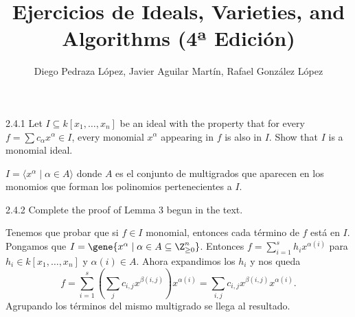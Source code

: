 \documentclass[twoside]{article}
\begin{document}
\title{Ejercicios de Ideals, Varieties, and Algorithms (4ª Edición)}
\author{Diego Pedraza López, Javier Aguilar Martín, Rafael González López}
\maketitle

\begin{ejercicio}{2.4.1}
Let $I ⊆ k[x_1,\dots , x_n]$ be an ideal with the property that for every $f =\sum
c_{α} x^{α} ∈ I$, every
monomial $x^α$ appearing in $f$ is also in $I$. Show that $I$ is a monomial ideal.
\end{ejercicio}
\begin{solucion}
$I=\langle x^\alpha\mid\alpha\in A\rangle$ donde $A$ es el conjunto de multigrados que aparecen en los monomios que forman los polinomios pertenecientes a $I$. 
\end{solucion}
\newpage

\begin{ejercicio}{2.4.2}
Complete the proof of Lemma 3 begun in the text.
\end{ejercicio}
\begin{solucion}
Tenemos que probar que si $f\in I$ monomial, entonces cada término de $f$ está en $I$. Pongamos que $I=\gene{x^{\alpha} \mid \alpha\in A\subseteq\Z^n_{\geq 0}}$. Entonces $f=\sum_{i=1}^s h_ix^{\alpha(i)}$ para $h_i\in k[x_1,\dots, x_n]$ y $\alpha(i)\in A$. Ahora expandimos los $h_i$ y nos queda
\[
f=\sum_{i=1}^s\left(\sum_j c_{i,j}x^{\beta(i,j)}\right)x^{\alpha(i)}=\sum_{i,j} c_{i,j}x^{\beta(i,j)}x^{\alpha(i)}.
\]
Agrupando los términos del mismo multigrado se llega al resultado.
\end{solucion}
\newpage
\end{document}

